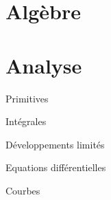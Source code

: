 \documentclass[12pt]{article}
\begin{document}
\part{Algèbre}

\begin{quiz}{}

\end{quiz}

\begin{quiz}{}

\end{quiz}

\begin{quiz}{}

\end{quiz}

\begin{quiz}{}

\end{quiz}

\begin{quiz}{}

\end{quiz}


\part{Analyse}

\begin{quiz}{Primitives}

\end{quiz}

\begin{quiz}{Intégrales}

\end{quiz}

\begin{quiz}{Développements limités}

\end{quiz}

\begin{quiz}{Equations différentielles}

\end{quiz}

\begin{quiz}{Courbes}

\end{quiz}
\end{document}
